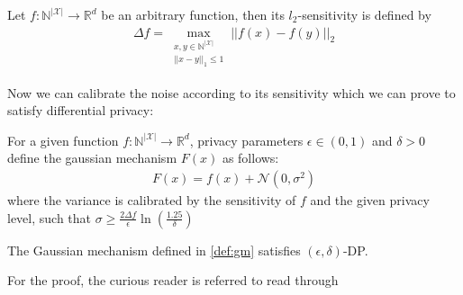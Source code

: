 \begin{definition}[$l_2$-sensitivity]
    Let $f:\mathbb{N}^{|\mathcal{X}|} \longrightarrow \mathbb{R}^d$ be an arbitrary function, then its $l_2$-sensitivity is defined by
    \begin{align}
        \Delta f = \max_{\substack{x,y \in \mathbb{N}^{|\mathcal{X}|} \\ ||x-y||_1\le 1}} ||f(x)-f(y)||_2 
    \end{align}
\end{definition}

Now we can calibrate the noise according to its sensitivity which we can prove to satisfy differential privacy:
\begin{definition}\label{def:gm} \label{def:gm}
    For a given function  $f:\mathbb{N}^{|\mathcal{X}|} \longrightarrow \mathbb{R}^d$, privacy parameters $\epsilon \in (0,1)$ and $\delta>0$ define the gaussian mechanism $F(x)$ as follows:
    \begin{align}
        F(x) = f(x) + \mathcal{N}(0, \sigma^2)
    \end{align}
    where the variance is calibrated by the sensitivity of $f$ and the given privacy level, such that $\sigma \ge \frac{2 \Delta f}{\epsilon}\ln(\frac{1.25}{\delta})$
\end{definition}

\begin{thm}
    The Gaussian mechanism defined in \cref{def:gm} satisfies $(\epsilon, \delta)$-DP.
\end{thm}
For the proof, the curious reader is referred to read through \parencite[][Appendix A]{dwork2014algorithmic}